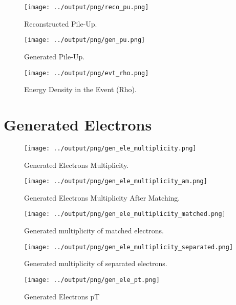 \documentclass[11pt]{book}
\begin{document}
\begin{figure}[htb]
\centering
\texttt{[image: ../output/png/reco\_pu.png]}
\caption{Reconstructed Pile-Up.}
\label{fig:reco_gen_pu}
\end{figure}

\begin{figure}[htb]
\centering
\texttt{[image: ../output/png/gen\_pu.png]}
\caption{Generated Pile-Up.}
\label{fig:reco_gen_pu}
\end{figure}

\begin{figure}[htb]
\centering
\texttt{[image: ../output/png/evt\_rho.png]}
\caption{Energy Density in the Event (Rho).}
\label{fig:rho}
\end{figure}
\clearpage


\section{Generated Electrons}

\begin{figure}[htb]
\centering
\texttt{[image: ../output/png/gen\_ele\_multiplicity.png]}
\caption{Generated Electrons Multiplicity.}
\label{fig:gen_ele_multiplicity}
\end{figure}

\begin{figure}[htb]
\centering
\texttt{[image: ../output/png/gen\_ele\_multiplicity\_am.png]}
\caption{Generated Electrons Multiplicity After Matching.}
\label{fig:gen_ele_multiplicity_am}
\end{figure}


\begin{figure}[htb]
\centering
\texttt{[image: ../output/png/gen\_ele\_multiplicity\_matched.png]}
\caption{Generated multiplicity of matched electrons.}
\label{fig:gn_ele_mat}
\end{figure}

\begin{figure}[htb]
\centering
\texttt{[image: ../output/png/gen\_ele\_multiplicity\_separated.png]}
\caption{Generated multiplicity of separated electrons.}
\label{fig:gn_ele_sep}
\end{figure}


\begin{figure}[htb]
\centering
\texttt{[image: ../output/png/gen\_ele\_pt.png]}
\caption{Generated Electrons pT}
\label{fig:gen_ele_pt}
\end{figure}
\end{document}
